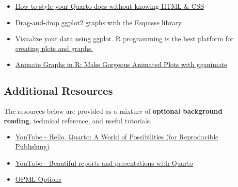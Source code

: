 \documentclass[
  letterpaper,
  DIV=11,
  numbers=noendperiod]{scrartcl}
\providecommand{\tightlist}{%
  \setlength{\itemsep}{0pt}\setlength{\parskip}{0pt}}\usepackage{longtable,booktabs,array}
\begin{document}
\begin{itemize}
\tightlist
\item
  \href{https://youtu.be/jX4_Dnzhl0M}{How to style your Quarto docs
  without knowing HTML \& CSS}
\item
  \href{https://youtu.be/FWLxE-ARuO8}{Drag-and-drop ggplot2 graphs with
  the Esquisse library}
\item
  \href{https://youtu.be/rfR9Nrpfnyg}{Visualize your data using ggplot.
  R programming is the best platform for creating plots and graphs.}
\item
  \href{https://www.youtube.com/watch?v=SnCi0s0e4Io}{Animate Graphs in
  R: Make Gorgeous Animated Plots with gganimate}
\end{itemize}

\hypertarget{additional-resources}{%
\subsection{Additional Resources}\label{additional-resources}}

The resources below are provided as a mixture of \textbf{optional
background reading}, technical reference, and useful tutorials.

\begin{itemize}
\tightlist
\item
  \href{https://youtu.be/Qrz2rUWM-uY}{YouTube - Hello, Quarto: A World
  of Possibilities (for Reproducible Publishing)}
\item
  \href{https://youtu.be/hbf7Ai3jnxY?t=1693}{YouTube - Beautiful reports
  and presentations with Quarto}
\item
  \href{https://quarto.org/docs/reference/formats/opml.html}{OPML
  Options}
\end{itemize}
\end{document}
